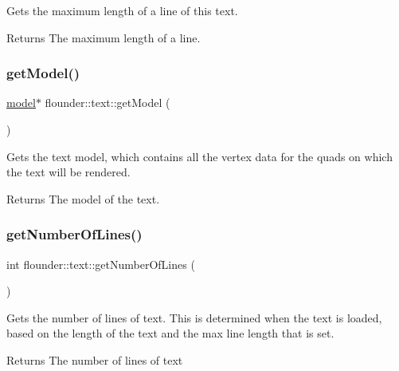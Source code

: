 Gets the maximum length of a line of this text. 

\begin{DoxyReturn}{Returns}
The maximum length of a line. 
\end{DoxyReturn}
\mbox{\label{classflounder_1_1text_a38c9b07991dd35da42e571500a8b442a}} 
\subsubsection{\texorpdfstring{get\+Model()}{getModel()}}
{\footnotesize\ttfamily \hyperlink{classflounder_1_1model}{model}$\ast$ flounder\+::text\+::get\+Model (\begin{DoxyParamCaption}{ }\end{DoxyParamCaption})\hspace{0.3cm}{\ttfamily [inline]}}



Gets the text model, which contains all the vertex data for the quads on which the text will be rendered. 

\begin{DoxyReturn}{Returns}
The model of the text. 
\end{DoxyReturn}
\mbox{\label{classflounder_1_1text_a19354c6e61de672476d09163291b9346}} 
\subsubsection{\texorpdfstring{get\+Number\+Of\+Lines()}{getNumberOfLines()}}
{\footnotesize\ttfamily int flounder\+::text\+::get\+Number\+Of\+Lines (\begin{DoxyParamCaption}{ }\end{DoxyParamCaption})\hspace{0.3cm}{\ttfamily [inline]}}



Gets the number of lines of text. This is determined when the text is loaded, based on the length of the text and the max line length that is set. 

\begin{DoxyReturn}{Returns}
The number of lines of text 
\end{DoxyReturn}
\mbox{\label{classflounder_1_1text_a28cb4cb2a57a28135fececb6a467fd8f}} 
